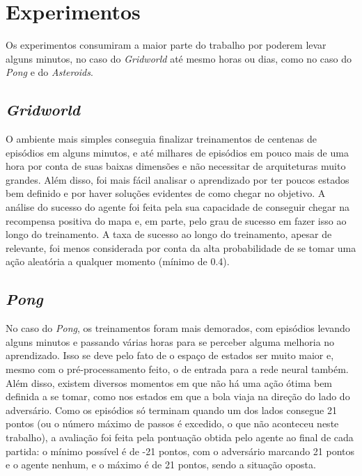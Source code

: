 \section{Experimentos}
\label{sec:exp}

Os experimentos consumiram a maior parte do trabalho por poderem levar alguns minutos, no caso do \textit{Gridworld} até mesmo horas ou dias, como no caso do \textit{Pong} e do \textit{Asteroids}.

\subsection{\textit{Gridworld}}
\label{sec:exp_gridworld}

O ambiente mais simples conseguia finalizar treinamentos de centenas de episódios em alguns minutos, e até milhares de episódios em pouco mais de uma hora por conta de suas baixas dimensões e não necessitar de arquiteturas muito grandes.
Além disso, foi mais fácil analisar o aprendizado por ter poucos estados bem definido e por haver soluções evidentes de como chegar no objetivo.
A análise do sucesso do agente foi feita pela sua capacidade de conseguir chegar na recompensa positiva do mapa e, em parte, pelo grau de sucesso em fazer isso ao longo do treinamento.
A taxa de sucesso ao longo do treinamento, apesar de relevante, foi menos considerada por conta da alta probabilidade de se tomar uma ação aleatória a qualquer momento (mínimo de 0.4).

\subsection{\textit{Pong}}
\label{sec:exp_pong}

No caso do \textit{Pong}, os treinamentos foram mais demorados, com episódios levando alguns minutos e passando várias horas para se perceber alguma melhoria no aprendizado.
Isso se deve pelo fato de o espaço de estados ser muito maior e, mesmo com o pré-processamento feito, o de entrada para a rede neural também.
Além disso, existem diversos momentos em que não há uma ação ótima bem definida a se tomar, como nos estados em que a bola viaja na direção do lado do adversário.
Como os episódios só terminam quando um dos lados consegue 21 pontos (ou o número máximo de passos é excedido, o que não aconteceu neste trabalho), a avaliação foi feita pela pontuação obtida pelo agente ao final de cada partida:
o mínimo possível é de -21 pontos, com o adversário marcando 21 pontos e o agente nenhum, e o máximo é de 21 pontos, sendo a situação oposta.

